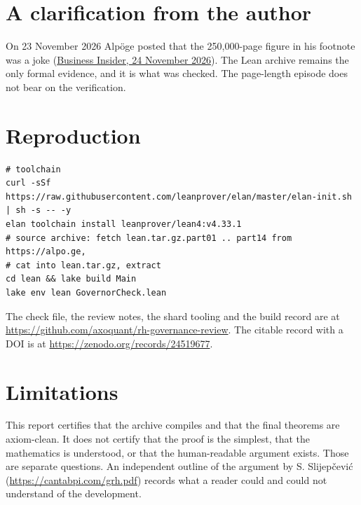 \documentclass[11pt]{article}
\begin{document}
\section{A clarification from the author}
On 23 November 2026 Alp\"oge posted that the 250,000-page figure in his footnote was a joke (\href{https://www.businessinsider.com/anthropic-levent-alpoe-riemann-hypothesis-page-length-joke-angers-mathematicians-2026-11}{Business Insider, 24 November 2026}). The Lean archive remains the only formal evidence, and it is what was checked. The page-length episode does not bear on the verification.

\section{Reproduction}
\begin{verbatim}
# toolchain
curl -sSf https://raw.githubusercontent.com/leanprover/elan/master/elan-init.sh | sh -s -- -y
elan toolchain install leanprover/lean4:v4.33.1
# source archive: fetch lean.tar.gz.part01 .. part14 from https://alpo.ge,
# cat into lean.tar.gz, extract
cd lean && lake build Main
lake env lean GovernorCheck.lean
\end{verbatim}
The check file, the review notes, the shard tooling and the build record are at \url{https://github.com/axoquant/rh-governance-review}. The citable record with a DOI is at \url{https://zenodo.org/records/24519677}.

\section{Limitations}
This report certifies that the archive compiles and that the final theorems are axiom-clean. It does not certify that the proof is the simplest, that the mathematics is understood, or that the human-readable argument exists. Those are separate questions. An independent outline of the argument by S. Slijep\v{c}evi\'c (\url{https://cantabpi.com/grh.pdf}) records what a reader could and could not understand of the development.
\end{document}
